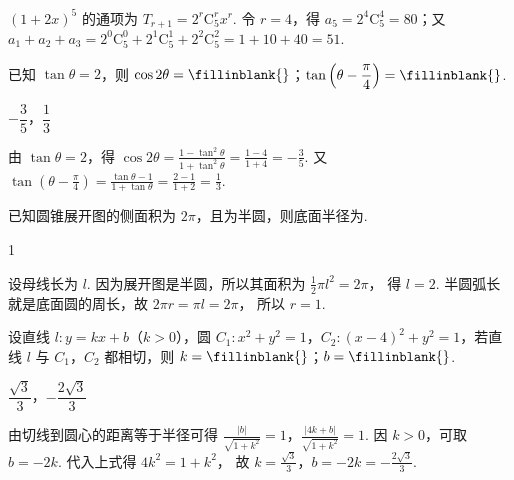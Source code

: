 \begin{solution}
\((1+2x)^5\) 的通项为
\(T_{r+1}=2^r\mathrm C_5^r x^r\).
令 \(r=4\)，得 \(a_5=2^4\mathrm C_5^4=80\)；又
\(a_1+a_2+a_3=2^0\mathrm C_5^0+2^1\mathrm C_5^1+2^2\mathrm C_5^2=1+10+40=51\).
\end{solution}

\begin{problem}
已知 \(\tan\theta=2\)，则 \(\cos2\theta=\fillinblank{}\)；\(\tan\left(\theta-\dfrac{\pi}{4}\right)=\fillinblank{}\).
\end{problem}

\begin{answer}
\(-\dfrac35\)，\(\dfrac13\)
\end{answer}

\begin{solution}
由 \(\tan\theta=2\)，得
\(\cos2\theta=\frac{1-\tan^2\theta}{1+\tan^2\theta}=\frac{1-4}{1+4}=-\frac35\).
又
\(\tan\left(\theta-\frac{\pi}{4}\right)=\frac{\tan\theta-1}{1+\tan\theta} =\frac{2-1}{1+2}=\frac13\).
\end{solution}

\begin{problem}
已知圆锥展开图的侧面积为 \(2\pi\)，且为半圆，则底面半径为\fillinblank{}.
\end{problem}

\begin{answer}
1
\end{answer}

\begin{solution}
设母线长为 \(l\). 因为展开图是半圆，所以其面积为
\(\frac12\pi l^2=2\pi\)，
得 \(l=2\).
半圆弧长就是底面圆的周长，故
\(2\pi r=\pi l=2\pi\)，
所以 \(r=1\).
\end{solution}

\begin{problem}
设直线 \(l:y=kx+b\)（\(k>0\)），圆 \(C_1:x^2+y^2=1\)，\(C_2:(x-4)^2+y^2=1\)，若直线 \(l\) 与 \(C_1\)，\(C_2\) 都相切，则 \(k=\fillinblank{}\)；\(b=\fillinblank{}\).
\end{problem}

\begin{answer}
\(\dfrac{\sqrt3}{3}\)，\(-\dfrac{2\sqrt3}{3}\)
\end{answer}

\begin{solution}
由切线到圆心的距离等于半径可得
\(\frac{|b|}{\sqrt{1+k^2}}=1\)，\(\frac{|4k+b|}{\sqrt{1+k^2}}=1\).
因 \(k>0\)，可取 \(b=-2k\). 代入上式得
\(4k^2=1+k^2\)，
故
\(k=\frac{\sqrt3}{3}\)，\(b=-2k=-\frac{2\sqrt3}{3}\).
\end{solution}

